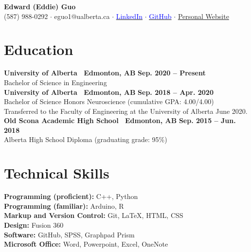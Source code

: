 \documentclass{article}
\begin{document}
\thispagestyle{plain}
\begin{flushleft}
    \LARGE \textbf{Edward (Eddie) Guo}\\ \vspace{0.25em}
    \normalfont \normalsize (587) 988-0292 $\cdot$ eguo1@ualberta.ca $\cdot$ \href{https://www.linkedin.com/in/eguo1}{\textcolor{blue}{LinkedIn}} $\cdot$ \href{https://github.com/tig3r66}{\textcolor{blue}{GitHub}} $\cdot$ \href{https://tig3r66.github.io/index.html}{Personal Website}\\
    \hrulefill
\end{flushleft}

\section*{Education}
    \textbf{University of Alberta \textbar\ Edmonton, AB} \hfill \textbf{Sep. 2020 -- Present}\\
    Bachelor of Science in Engineering\\

    \textbf{University of Alberta \textbar\ Edmonton, AB} \hfill \textbf{Sep. 2018 -- Apr. 2020}\\
    Bachelor of Science Honors Neuroscience (cumulative GPA: 4.00/4.00)\\
    Transferred to the Faculty of Engineering at the University of Alberta June 2020.\\

    \textbf{Old Scona Academic High School \textbar\ Edmonton, AB} \hfill \textbf{Sep. 2015 -- Jun. 2018}\\
    Alberta High School Diploma (graduating grade: 95\%)


\section*{Technical Skills}
\textbf{Programming (proficient):} C++, Python\\
\textbf{Programming (familiar):} Arduino, R\\
\textbf{Markup and Version Control:} Git, \LaTeX, HTML, CSS\\
\textbf{Design:} Fusion 360\\
\textbf{Software:} GitHub, SPSS, Graphpad Prism\\
\textbf{Microsoft Office:} Word, Powerpoint, Excel, OneNote
\end{document}
